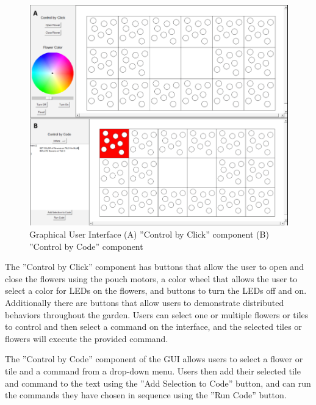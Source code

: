 \documentclass[letterpaper, 10 pt, conference]{ieeeconf}  %
\begin{document}
\begin{figure}[thpb]
	\centering
	\includegraphics[scale=0.25]{GUIComponents.png}
	\caption{Graphical User Interface (A) ''Control by Click'' component  (B) ''Control by Code'' component}
	\label{fig: GUI}
	
\end{figure}

The ''Control by Click'' component has buttons that allow the user to open and close the flowers using the pouch motors, a color wheel that allows the user to select a color for LEDs on the flowers, and buttons to turn the LEDs off and on.  Additionally there are buttons that allow users to demonstrate distributed behaviors throughout the garden.  Users can select one or multiple flowers or tiles to control and then select a command on the interface, and the selected tiles or flowers will execute the provided command.

The ''Control by Code'' component of the GUI allows users to select a flower or tile and a command from a drop-down menu.  Users then add their selected tile and command to the text using the ''Add Selection to Code'' button, and can run the commands they have chosen in sequence using the ''Run Code'' button.
\end{document}
